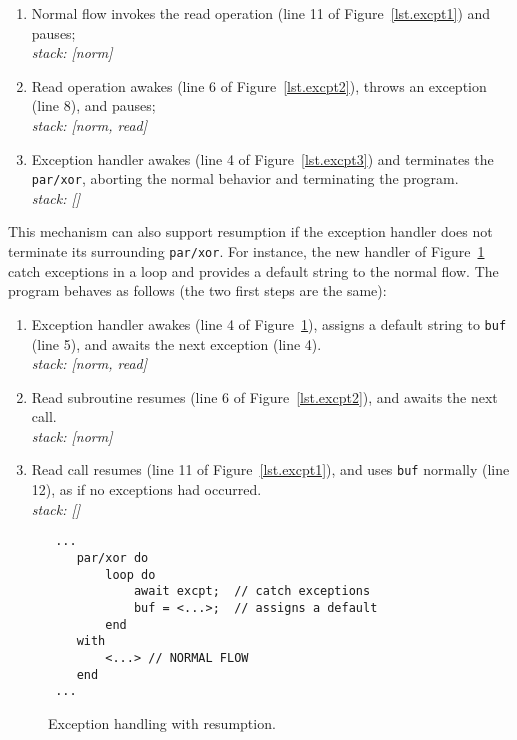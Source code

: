 \documentclass{acm_proc_article-sp}
\newcommand{\code}[1] {{\small{\texttt{#1}}}}
\newcommand{\1}{\;}
\newcommand{\2}{\;\;}
\newcommand{\3}{\;\;\;}
\newcommand{\5}{\;\;\;\;\;}
\begin{document}
{\small
\begin{enumerate}
\setlength{\itemsep}{0pt}
\item Normal flow invokes the read operation (line 11 of 
    Figure~\ref{lst.excpt1}) and pauses;\\
    \emph{stack: [norm]}
\item Read operation awakes (line 6 of Figure~\ref{lst.excpt2}), throws an 
    exception (line 8), and pauses;\\
    \emph{stack: [norm, read]}
\item Exception handler awakes (line 4 of Figure~\ref{lst.excpt3}) and 
terminates the \code{par/xor}, aborting the normal behavior and terminating the 
program. \\
    \emph{stack: []}
\end{enumerate}
}

This mechanism can also support resumption if the exception handler does not 
terminate its surrounding \code{par/xor}.
For instance, the new handler of Figure~\ref{lst.excpt4} catch exceptions in a 
loop and provides a default string to the normal flow.
The program behaves as follows (the two first steps are the same):

{\small
\begin{enumerate}[start=3]
\setlength{\itemsep}{0pt}
\item Exception handler awakes (line 4 of Figure~\ref{lst.excpt4}), assigns a 
default string to \code{buf} (line 5), and awaits the next exception (line 4).  \\
    \emph{stack: [norm, read]}
\item Read subroutine resumes (line 6 of Figure~\ref{lst.excpt2}), and awaits 
the next call. \\
    \emph{stack: [norm]}
\item Read call resumes (line 11 of Figure~\ref{lst.excpt1}), and uses 
\code{buf} normally (line 12), as if no exceptions had occurred. \\
    \emph{stack: []}
\end{enumerate}
}

\begin{figure}[t]
\begin{lstlisting}
 ...
    par/xor do
        loop do
            await excpt;  // catch exceptions
            buf = <...>;  // assigns a default
        end
    with
        <...> // NORMAL FLOW
    end
 ...
\end{lstlisting}
\caption{ Exception handling with resumption.
\label{lst.excpt4}
}
\end{figure}
\end{document}
